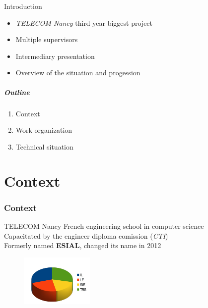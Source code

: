 \documentclass[12pt]{beamer}
\title{\titreA}
\subtitle{\titreB}
\author{Nicolas BOUGET, Julien GUEPIN, Marc PINHEDE, Julien VAUBOURG}
\institute{TELECOM Nancy}
\date{December 20, 2012}
\begin{document}
\begin{frame}
\titlepage
\end{frame}

\begin{frame}{Introduction}
    \begin{itemize}
	\item \emph{TELECOM Nancy} third year biggest project
	\vfill
	\item Multiple supervisors
	\vfill
	\item Intermediary presentation
	\vfill
	\item Overview of the situation and progession
    \end{itemize}
\end{frame}

\begin{frame}
    \frametitle{Outline}
    \begin{enumerate}
	\item \large{Context}
	\vfill
	\item \large{Work organization}
	\vfill
	\item \large{Technical situation}
    \end{enumerate}
\end{frame}



    
\part{Context}
\frame{\partpage}
\section{Context}

\begin{frame}{TELECOM Nancy}
    French engineering school in computer science\\
    \vfill
    Capacitated by the engineer diploma comission (\emph{CTI})\\
    \vfill
    Formerly named \textbf{ESIAL}, changed its name in 2012\\
    \vfill
    \begin{figure}
	\includegraphics[width=100pt]{img/promo.jpg}
    \end{figure}
\end{frame}
\end{document}
